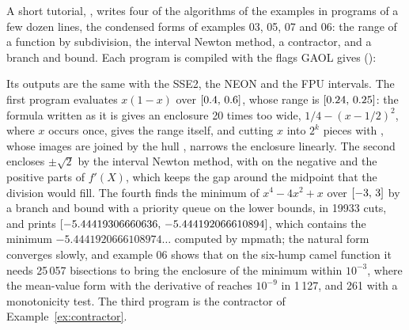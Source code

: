 \medskip
A short tutorial, , writes four of the algorithms
of the examples in programs of a few dozen lines, the condensed forms of
examples 03, 05, 07 and 06: the range of a function by subdivision, the
interval Newton method, a contractor, and a branch and bound. Each program
is compiled with the flags GAOL gives ():
Its outputs are the same with the SSE2, the NEON and the FPU intervals.
The first program evaluates $x(1-x)$ over
$$, whose range is $$: the formula written as
it is gives an enclosure 20 times too wide, $1/4-(x-1/2)^2$, where $x$
occurs once, gives the range itself, and cutting $x$ into $2^k$ pieces with
, whose images are joined by the hull \code{|}, narrows
the enclosure linearly. The second encloses $\pm{}$ by the interval
Newton method, with  on the negative and the positive parts
of $f'(X)$, which keeps the gap around the midpoint that the division
\code{/} would fill. The fourth finds the minimum of $x^4-4x^2+x$ over
$$ by a branch and bound with a priority queue on the lower
bounds, in 19933 cuts, and prints
$$, which contains the minimum
$-5.4441920666108974\ldots$ computed by mpmath; the natural form converges
slowly, and example 06 shows that on the six-hump camel function it needs
25\,057 bisections to bring the enclosure of the minimum within $10^{-3}$,
where the mean-value form with the derivative of  reaches
$10^{-9}$ in 1\,127, and 261 with a monotonicity test. The third program is
the contractor of Example~\ref{ex:contractor}.

